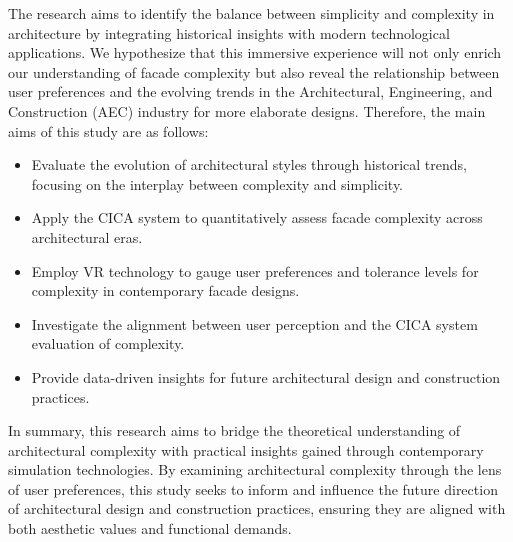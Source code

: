 The research aims to identify the balance between simplicity and complexity in architecture by integrating historical insights with modern technological applications.
We hypothesize that this immersive experience will not only enrich our understanding of facade complexity but also reveal the relationship between user preferences and the evolving trends in the Architectural, Engineering, and Construction (AEC) industry for more elaborate designs.
Therefore, the main aims of this study are as follows:

\begin{itemize}
    \item Evaluate the evolution of architectural styles through historical trends, focusing on the interplay between complexity and simplicity.
    \item Apply the CICA system to quantitatively assess facade complexity across architectural eras.
    \item Employ VR technology to gauge user preferences and tolerance levels for complexity in contemporary facade designs.
    \item Investigate the alignment between user perception and the CICA system evaluation of complexity.
    \item Provide data-driven insights for future architectural design and construction practices.
\end{itemize}

In summary, this research aims to bridge the theoretical understanding of architectural complexity with practical insights gained through contemporary simulation technologies.
By examining architectural complexity through the lens of user preferences, this study seeks to inform and influence the future direction of architectural design and construction practices, ensuring they are aligned with both aesthetic values and functional demands.

%
